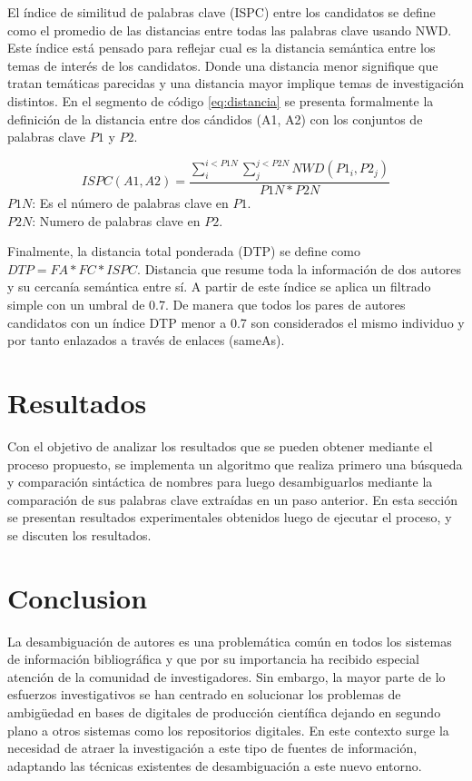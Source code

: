 \documentclass[conference]{IEEEtran}
\begin{document}
El índice de similitud de palabras clave (ISPC) entre los candidatos se define como el promedio de las distancias entre todas las palabras clave usando NWD. Este índice está pensado para reflejar cual es la distancia semántica entre los temas de interés de los candidatos. Donde una distancia menor signifique que tratan temáticas parecidas y una distancia mayor implique temas de investigación distintos. En el segmento de código \ref{eq:distancia} se presenta formalmente la definición de la distancia entre dos cándidos (A1, A2) con los conjuntos de  palabras clave $P1$ y $P2$.

\begin{equation}\label{eq:distancia}
ISPC(A1,A2) = \frac{\sum_i^{i<P1N}\sum_j^{j<P2N}NWD(P1_i, P2_j)}{P1N*P2N}
\end{equation}
$P1N$: Es el número de palabras clave en $P1$.\\
$P2N$: Numero de palabras clave en $P2$.

Finalmente, la distancia total ponderada (DTP) se define como $DTP= FA*FC*ISPC$. Distancia que resume toda la información de dos autores y su cercanía semántica entre sí. A partir de este índice se aplica un filtrado simple con un umbral de 0.7. De manera que todos los pares de autores candidatos con un índice DTP menor a 0.7 son considerados el mismo individuo y por tanto enlazados a través de enlaces (sameAs).

\section{Resultados}
Con el objetivo de analizar los resultados que se pueden obtener mediante el proceso propuesto, se implementa un algoritmo que realiza primero una búsqueda y comparación sintáctica de nombres para luego desambiguarlos mediante la comparación de sus palabras clave extraídas en un paso anterior. En esta sección se presentan resultados experimentales obtenidos luego de ejecutar el proceso, y se discuten los resultados.

\section{Conclusion}
La desambiguación de autores es una problemática común en todos los sistemas de información bibliográfica y que por su importancia ha recibido especial atención de la comunidad de investigadores. Sin embargo, la mayor parte de lo esfuerzos investigativos se han centrado en solucionar los problemas de ambigüedad en bases de digitales de producción científica dejando   en segundo plano a otros sistemas como los repositorios digitales. En este contexto surge la necesidad de atraer la investigación a este tipo de fuentes de información, adaptando las técnicas existentes de desambiguación a este nuevo entorno.
\end{document}
